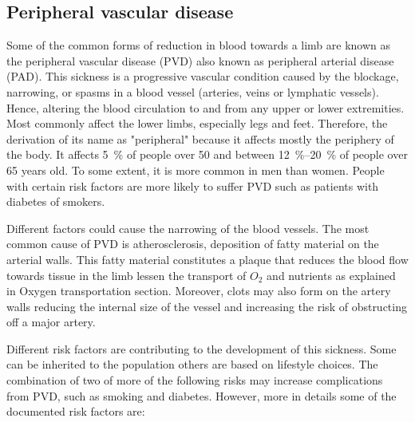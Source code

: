 \subsection{Peripheral vascular disease}
\label{section literature 2.1}
Some of the common forms of reduction in blood towards a limb are known as the peripheral vascular disease (PVD) also known as peripheral arterial disease (PAD). This sickness is a progressive vascular condition caused by the blockage, narrowing, or spasms in a blood vessel (arteries, veins or lymphatic vessels). Hence, altering the blood circulation to and from any upper or lower extremities.  Most commonly affect the lower limbs, especially legs and feet. Therefore, the derivation of its name as "peripheral" because it affects mostly the periphery of the body. It affects \SI{5}{\percent} of people over \num{50} and between \SIrange{12}{20}{\percent} of people over 65 years old. To some extent, it is more common in men than women. People with certain risk factors are more likely to suffer PVD such as patients with diabetes of smokers.  


Different factors could cause the narrowing of the blood vessels. The most common cause of PVD is atherosclerosis, deposition of fatty material on the arterial walls. This fatty material constitutes a plaque that reduces the blood flow towards tissue in the limb lessen the transport of $O_2$ and nutrients as explained in Oxygen transportation section. Moreover, clots may also form on the artery walls reducing the internal size of the vessel and increasing the risk of obstructing off a major artery. 

Different risk factors are contributing to the development of this sickness. Some can be inherited to the population others are based on lifestyle choices. The combination of two of more of the following risks may increase complications from PVD, such as smoking and diabetes. However, more in details some of the documented risk factors are:

